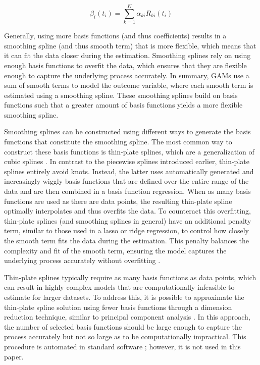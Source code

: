 \documentclass[man, floatsintext]{apa7}
\begin{document}
\begin{equation}
  \beta_i(t_i) = \sum^K_{k = 1} \alpha_{ki} R_{ki}(t_i)
\end{equation}

\noindent Generally, using more basis functions (and thus coefficients) results
in a smoothing spline (and thus smooth term) that is more flexible, which means
that it can fit the data closer during the estimation. Smoothing splines rely
on using enough basis functions to overfit the data, which ensures that they
are flexible enough to capture the underlying process accurately. In summary,
GAMs use a sum of smooth terms to model the outcome variable, where each smooth
term is estimated using a smoothing spline. These smoothing splines build on
basis functions such that a greater amount of basis functions yields a more
flexible smoothing spline.

Smoothing splines can be constructed using different ways to generate the basis
functions that constitute the smoothing spline. The most common way to
construct these basis functions is thin-plate splines, which are a
generalization of cubic splines \parencite{wood_generalized_2006}. In contrast
to the piecewise splines introduced earlier, thin-plate splines entirely avoid
knots. Instead, the latter uses automatically generated and increasingly wiggly
basis functions that are defined over the entire range of the data and are then
combined in a basis function regression. When as many basis functions are used
as there are data points, the resulting thin-plate spline optimally
interpolates and thus overfits the data. To counteract this overfitting,
thin-plate splines (and smoothing splines in general) have an additional
penalty term, similar to those used in a lasso or ridge regression, to control
how closely the smooth term fits the data during the estimation. This penalty
balances the complexity and fit of the smooth term, ensuring the model captures
the underlying process accurately without overfitting
\parencite{gu_smoothing_2013, wahba_spline_1980}.

Thin-plate splines typically require as many basis functions as data points,
which can result in highly complex models that are computationally infeasible
to estimate for larger datasets. To address this, it is possible to approximate
the thin-plate spline solution using fewer basis functions through a dimension
reduction technique, similar to principal component analysis
\parencite{wood_thin_2003}. In this approach, the number of selected basis
functions should be large enough to capture the process accurately but not so
large as to be computationally impractical. This procedure is automated in
standard software \parencite{R-mgcv_a}; however, it is not used in this paper.
\end{document}
